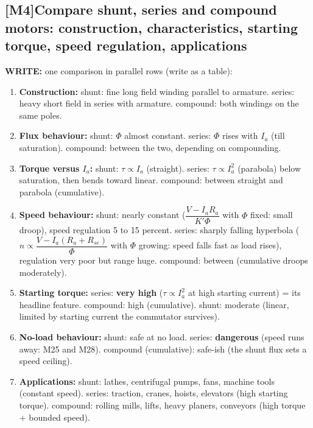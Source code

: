 \documentclass[11pt]{article}
\newcommand{\q}[2]{\subsection*{\color{copper}#1\quad\color{iron}#2}}
\newcommand{\w}[1]{\textbf{\color{copper}WRITE:} #1}
\begin{document}
\q{[M4]}{Compare shunt, series and compound motors: construction, characteristics, starting torque, speed regulation, applications}
\w{one comparison in parallel rows (write as a table):}
\begin{enumerate}[label=\arabic*.]
\item \textbf{Construction:} shunt: fine long field winding parallel to armature. series: heavy short field in series with armature. compound: both windings on the same poles.
\item \textbf{Flux behaviour:} shunt: $\Phi$ almost constant. series: $\Phi$ rises with $I_a$ (till saturation). compound: between the two, depending on compounding.
\item \textbf{Torque versus $I_a$:} shunt: $\tau \propto I_a$ (straight). series: $\tau \propto I_a^2$ (parabola) below saturation, then bends toward linear. compound: between straight and parabola (cumulative).
\item \textbf{Speed behaviour:} shunt: nearly constant ($\dfrac{V - I_a R_a}{K' \Phi}$ with $\Phi$ fixed: small droop), speed regulation 5 to 15 percent. series: sharply falling hyperbola ($n \propto \dfrac{V - I_a(R_a + R_{se})}{\Phi}$ with $\Phi$ growing: speed falls fast as load rises), regulation very poor but range huge. compound: between (cumulative droops moderately).
\item \textbf{Starting torque:} series: \textbf{very high} ($\tau \propto I_a^2$ at high starting current) = its headline feature. compound: high (cumulative). shunt: moderate (linear, limited by starting current the commutator survives).
\item \textbf{No-load behaviour:} shunt: safe at no load. series: \textbf{dangerous} (speed runs away: M25 and M28). compound (cumulative): safe-ish (the shunt flux sets a speed ceiling).
\item \textbf{Applications:} shunt: lathes, centrifugal pumps, fans, machine tools (constant speed). series: traction, cranes, hoists, elevators (high starting torque). compound: rolling mills, lifts, heavy planers, conveyors (high torque + bounded speed).
\end{enumerate}
\end{document}
